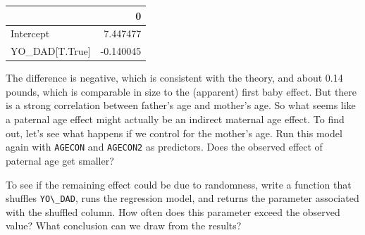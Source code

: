\begin{tabular}{lr}
\midrule
{} &         0 \\
\midrule
Intercept      &  7.447477 \\
YO\_DAD[T.True] & -0.140045 \\
\midrule
\end{tabular}

The difference is negative, which is consistent with the theory, and
about 0.14 pounds, which is comparable in size to the (apparent) first
baby effect. But there is a strong correlation between father's age and
mother's age. So what seems like a paternal age effect might actually be
an indirect maternal age effect. To find out, let's see what happens if
we control for the mother's age. Run this model again with
\passthrough{\lstinline!AGECON!} and \passthrough{\lstinline!AGECON2!}
as predictors. Does the observed effect of paternal age get smaller?

To see if the remaining effect could be due to randomness, write a
function that shuffles \passthrough{\lstinline!YO\_DAD!}, runs the
regression model, and returns the parameter associated with the shuffled
column. How often does this parameter exceed the observed value? What
conclusion can we draw from the results?

